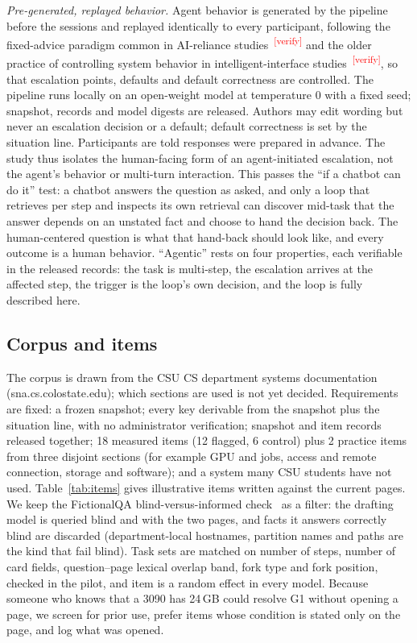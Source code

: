 \documentclass[sigconf,nonacm]{acmart}
\newcommand{\verify}{\textsuperscript{\textcolor{red}{[verify]}}}
\begin{document}
\emph{Pre-generated, replayed behavior.} Agent behavior is generated by the
pipeline before the sessions and replayed identically to every participant,
following the fixed-advice paradigm common in AI-reliance
studies~\cite{bucinca2021,vasconcelos2023,schemmer2023}\verify{} and the
older practice of controlling system behavior in intelligent-interface
studies~\cite{dahlback1993}\verify{}, so that escalation points, defaults
and default correctness are controlled. The pipeline runs locally on an
open-weight model at temperature 0 with a fixed seed; snapshot, records and
model digests are released. Authors may edit wording but never an
escalation decision or a default; default correctness is set by the
situation line. Participants are told responses were prepared in advance.
The study thus isolates the human-facing form of an agent-initiated
escalation, not the agent's behavior or multi-turn interaction. This passes the ``if a
chatbot can do it'' test: a chatbot answers the question as asked, and
only a loop that retrieves per step and inspects its own retrieval can
discover mid-task that the answer depends on an unstated fact and choose to
hand the decision back. The human-centered question is what that hand-back
should look like, and every outcome is a human behavior. ``Agentic'' rests
on four properties, each verifiable in the released records: the task is
multi-step, the escalation arrives at the affected step, the trigger is the
loop's own decision, and the loop is fully described here.

\subsection{Corpus and items}
\label{sec:corpus}

The corpus is drawn from the CSU CS department systems documentation
(sna.cs.colostate.edu); which sections are used is not yet decided.
Requirements are fixed: a frozen snapshot; every key derivable from the
snapshot plus the situation line, with no administrator verification;
snapshot and item records released together; 18 measured items (12
flagged, 6 control) plus 2 practice items from three disjoint sections
(for example GPU and jobs, access and remote connection, storage and
software); and a system many CSU students have not used.
Table~\ref{tab:items} gives illustrative items written against the current
pages. We keep the FictionalQA blind-versus-informed
check~\cite{kirchenbauer2026} as a filter: the drafting model is queried
blind and with the two pages, and facts it answers correctly blind are
discarded (department-local hostnames, partition names and paths are the
kind that fail blind). Task sets are matched on number of steps, number of
card fields, question--page lexical overlap band, fork type and fork
position, checked in the pilot, and item is a random effect in every model.
Because someone who knows that a 3090 has 24\,GB could resolve G1 without
opening a page, we screen for prior use, prefer items whose condition is
stated only on the page, and log what was opened.
\end{document}
